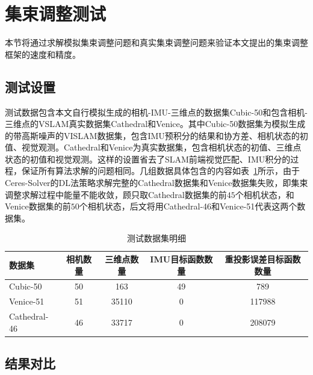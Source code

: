 \section{集束调整测试}

本节将通过求解模拟集束调整问题和真实集束调整问题来验证本文提出的集束调整框架的速度和精度。

\subsection{测试设置}

测试数据包含本文自行模拟生成的相机-IMU-三维点的数据集Cubic-50和包含相机-三维点的VSLAM真实数据集Cathedral\citep{kim2014influence}和Venice\citep{kummerle2011g}。其中Cubic-50数据集为模拟生成的带高斯噪声的VISLAM数据集，包含IMU预积分的结果和协方差、相机状态的初值、视觉观测。Cathedral和Venice为真实数据集，包含相机状态的初值、三维点状态的初值和视觉观测。这样的设置省去了SLAM前端视觉匹配、IMU积分的过程，保证所有算法求解的问题相同。几组数据具体包含的内容如表~\ref{tab:dataset}所示，由于Ceres-Solver的DL法策略求解完整的Cathedral数据集和Venice数据集失败，即集束调整求解过程中能量不能收敛，顾只取Cathedral数据集的前$45$个相机状态，和Venice数据集的前$50$个相机状态，后文将用Cathedral-46和Venice-51代表这两个数据集。

{
\linespread{1}
\begin{table}[htb!]
\caption{测试数据集明细}
\label{tab:dataset}
\centering
\begin{tabular}{l|cccc}
    \toprule
    数据集       & 相机数量 & 三维点数量 & IMU目标函数数量 & 重投影误差目标函数数量 \\ \midrule
    Cubic-50     &       50 &        163 &              49 &                    789 \\
    Venice-51    &       51 &      35110 &               0 &                 117988 \\
    Cathedral-46 &       46 &      33717 &               0 &                 208079 \\
    \bottomrule
\end{tabular}
\end{table}
}

\subsection{结果对比}

